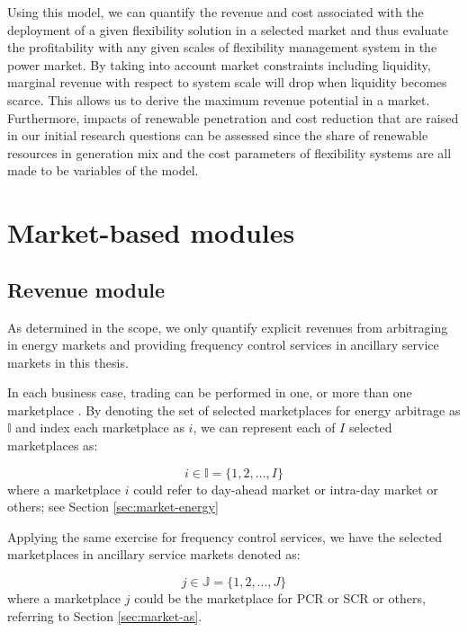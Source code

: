 Using this model, we can quantify the revenue and cost associated with the deployment of a given flexibility solution in a selected market and thus evaluate the profitability with any given scales of flexibility management system in the power market. By taking into account market constraints including liquidity, marginal revenue with respect to system scale will drop when liquidity becomes scarce. This allows us to derive the maximum revenue potential in a market. Furthermore, impacts of renewable penetration and cost reduction that are raised in our initial research questions can be assessed since the share of renewable resources in generation mix and the cost parameters of flexibility systems are all made to be variables of the model.

\section{Market-based modules}

\subsection{Revenue module}
\label{sec:revenue}
As determined in the scope, we only quantify explicit revenues from arbitraging in energy markets and providing frequency control services in ancillary service markets in this thesis.

In each business case, trading can be performed in one, or more than one marketplace%
. By denoting the set of selected marketplaces for energy arbitrage as $\mathbb{I}$ and index each marketplace as $i$, we can represent each of $I$ selected marketplaces as:

\begin{equation}
\label{eq:set-I}
	i \in \mathbb{I} = \{1,2,\dots,I\}
\end{equation}
where a marketplace $i$ could refer to day-ahead market or intra-day market or others; see Section \ref{sec:market-energy}

Applying the same exercise for frequency control services, we have the selected marketplaces in ancillary service markets denoted as:

\begin{equation}
\label{eq:set-J}
j \in \mathbb{J} = \{1,2,\dots,J\}
\end{equation}
where a marketplace $j$ could be the marketplace for PCR or SCR or others, referring to Section \ref{sec:market-as}.

